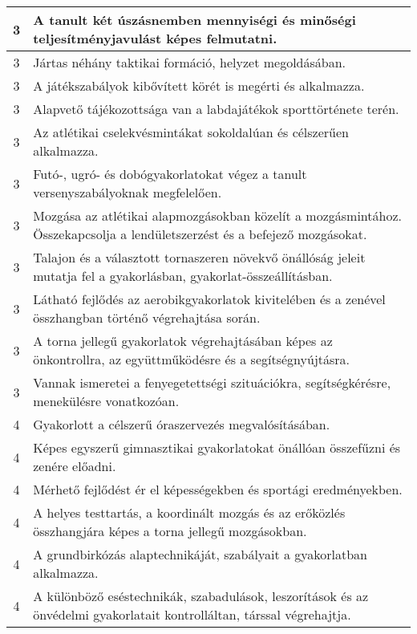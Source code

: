 \begin{longtable}{c | p{} }
                                
                                          3 &  A tanult két úszásnemben mennyiségi és minőségi teljesítményjavulást képes felmutatni. \\ \hline
                                          3 &  Jártas néhány taktikai formáció, helyzet megoldásában. \\ \hline
                                          3 &  A játékszabályok kibővített körét is megérti és alkalmazza. \\ \hline
                                          3 &  Alapvető tájékozottsága van a labdajátékok sporttörténete terén. \\ \hline
                                          3 &  Az atlétikai cselekvésmintákat sokoldalúan és célszerűen alkalmazza. \\ \hline
                                          3 &  Futó-, ugró- és dobógyakorlatokat végez a tanult versenyszabályoknak megfelelően. \\ \hline
                                          3 &  Mozgása az atlétikai alapmozgásokban közelít a mozgásmintához. Összekapcsolja a lendületszerzést és a befejező mozgásokat. \\ \hline
                                          3 &  Talajon és a választott tornaszeren növekvő önállóság jeleit mutatja fel a gyakorlásban, gyakorlat-összeállításban. \\ \hline
                                          3 &  Látható fejlődés az aerobikgyakorlatok kivitelében és a zenével összhangban történő végrehajtása során. \\ \hline
                                          3 &  A torna jellegű gyakorlatok végrehajtásában képes az önkontrollra, az együttműködésre és a segítségnyújtásra. \\ \hline
                                          3 &  Vannak ismeretei a fenyegetettségi szituációkra, segítségkérésre, menekülésre vonatkozóan. \\ \hline
                                      
                                
                                          4 &  Gyakorlott a célszerű óraszervezés megvalósításában. \\ \hline
                                          4 &  Képes egyszerű gimnasztikai gyakorlatokat önállóan összefűzni és zenére előadni. \\ \hline
                                          4 &  Mérhető fejlődést ér el képességekben és sportági eredményekben. \\ \hline
                                          4 &  A helyes testtartás, a koordinált mozgás és az erőközlés összhangjára képes a torna jellegű mozgásokban. \\ \hline
                                          4 &  A grundbirkózás alaptechnikáját, szabályait a gyakorlatban alkalmazza. \\ \hline
                                          4 &  A különböző eséstechnikák, szabadulások, leszorítások és az önvédelmi gyakorlatait kontrolláltan, társsal végrehajtja. \\ \hline
                                      

\end{longtable}
